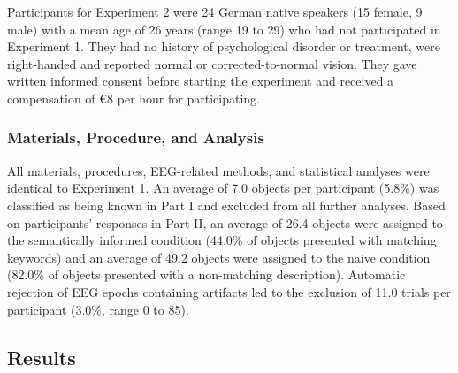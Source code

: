 \documentclass[
  english,
  man,11pt,floatsintext]{apa7}
\begin{document}
Participants for Experiment 2 were 24 German native speakers (15 female, 9 male) with a mean age of 26 years (range 19 to 29) who had not participated in Experiment 1. They had no history of psychological disorder or treatment, were right-handed and reported normal or corrected-to-normal vision. They gave written informed consent before starting the experiment and received a compensation of €8 per hour for participating.

\hypertarget{materials-procedure-and-analysis}{%
\subsubsection{Materials, Procedure, and Analysis}\label{materials-procedure-and-analysis}}

All materials, procedures, EEG-related methods, and statistical analyses were identical to Experiment 1. An average of 7.0 objects per participant (5.8\%) was classified as being known in Part I and excluded from all further analyses. Based on participants' responses in Part II, an average of 26.4 objects were assigned to the semantically informed condition (44.0\% of objects presented with matching keywords) and an average of 49.2 objects were assigned to the naive condition (82.0\% of objects presented with a non-matching description). Automatic rejection of EEG epochs containing artifacts led to the exclusion of 11.0 trials per participant (3.0\%, range 0 to 85).

\hypertarget{results-1}{%
\subsection{Results}\label{results-1}}
\end{document}
